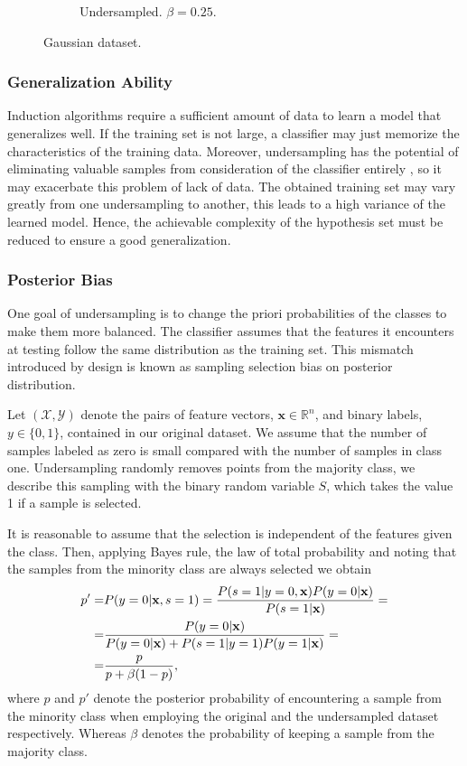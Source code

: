 \documentclass[conference]{IEEEtran}
\begin{document}
\begin{figure}[h]
\begin{subfigure}[b]{0.24\textwidth}
			         \caption{Undersampled. $\beta=0.25$.}
			         \label{fig:Undersampling_2D_UndersampledDataset}
			     \end{subfigure}
			        \caption{Gaussian dataset.}
			        \label{fig:Undersampling_2D_OriginalHistograms}
			\end{figure}

	\subsubsection{Generalization Ability}
		Induction algorithms require a sufficient amount of data to learn a model that generalizes well.  If the training set is not large, a classifier may just memorize the characteristics of the training data. Moreover, undersampling has the potential of eliminating valuable samples from consideration of the classifier entirely \cite{undersampling_generalization}, so it may exacerbate this problem of lack of data. The obtained training set may vary greatly from one undersampling to another, this leads to a high variance of the learned model. Hence, the achievable complexity of the hypothesis set must be reduced to ensure a good generalization.
		
	\subsubsection{Posterior Bias}
		One goal of undersampling is to change the priori probabilities of the classes to make them more balanced. The classifier assumes that the features it encounters at testing follow the same distribution as the training set. This mismatch introduced by design is known as sampling selection bias \cite{sampling_bias} on posterior distribution.

		Let $(\mathcal{X}, \mathcal{Y})$ denote the pairs of feature vectors, $\mathbf{x} \in \mathbb{R}^n$,  and binary labels, $y \in \{0, 1\}$, contained in our original dataset. We assume that the number of samples labeled as zero is small compared with the number of samples in class one. Undersampling randomly removes points from the majority class, we describe this sampling with the binary random variable $S$, which takes the value 1 if a sample is selected.

		It is reasonable to assume that the selection is independent of the features given the class. Then, applying Bayes rule, the law of total probability and noting that the samples from the minority class are always selected we obtain
		\begin{align*} \label{posterior}
			p' = & P(y=0|\mathbf{x}, s=1)=  \frac{P(s=1|y=0, \mathbf{x})P(y=0|\mathbf{x})}{P(s=1|\mathbf{x})}=\notag\\
					=&  \frac{P(y=0|\mathbf{x})}{P(y=0|\mathbf{x})+P(s=1|y=1)P(y=1|\mathbf{x})}=\notag\\
=&\frac{p}{p+\beta(1-p)},
		\end{align*}
where $p$ and $p'$ denote the posterior probability of encountering a sample from the minority class when employing the original and the undersampled dataset respectively. Whereas $\beta$ denotes the probability of keeping a sample from the majority class.
\end{document}
